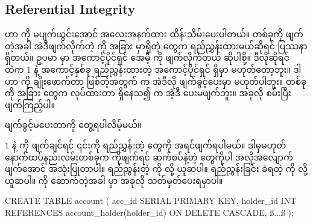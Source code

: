 \subsection*{Referential Integrity}
 ဟာ  ကို မပျက်ယွင်းအောင် အလေးအနက်ထား  ထိန်းသိမ်းပေးပါတယ်။  တစ်ခုကို ဖျက်တဲ့အခါ အဲဒီဖျက်လိုက်တဲ့  ကို အခြား  မှာရှိတဲ့  တွေက ရည်ညွှန်းထားမယ်ဆိုရင် ပြဿနာရှိတယ်။ ဥပမာ   မှာ အကောင့်ပိုင်ရှင် အေမီ့  ကို ဖျက်လိုက်တယ် ဆိုပါစို့။ ဒီလိုဆိုရင်   ထဲက  $1$ နဲ့ အကောင့်နှစ်ခု ရည်ညွှန်းထားတဲ့ အကောင့်ပိုင်ရှင်  ရှိမှာ မဟုတ်တော့ဘူး။ ဒါဟာ  ကို ချိုးဖောက်တာ ဖြစ်တဲ့အတွက်  က အဲဒီလို ဖျက်ခွင့်ပေးမှာ မဟုတ်ပါဘူး။  တစ်ခုကို အခြား  တွေက  လုပ်ထားတာ ရှိနေသ၍  က အဲ့ဒီ  ပေးမဖျက်ဘူး။ အခုလို စမ်းပြီး ဖျက်ကြည့်ပါ။ 
%
\begin{figure}[tbh!]
\caption{} 
\label{fig:ref_integrity}
\end{figure}%
ဖျက်ခွင့်မပေးတာကို တွေ့ရပါလိမ့်မယ်။

 $1$ နဲ့  ကို ဖျက်ချင်ရင် ၎င်းကို ရည်ညွှန်းတဲ့  တွေကို အရင်ဖျက်ရပါမယ်။ ဒါမှမဟုတ် နောက်ထပ်နည်းလမ်းတစ်ခုက  ကိုဖျက်ရင် ဆက်စပ်နဲ့တဲ့  တွေကိုပါ အလိုအလျောက် ဖျက်အောင်   အသုံးပြုတာပါ။ ရည်ညွှန်းတဲ့  ကို  လို့ ယူဆပါ။ ရည်ညွှန်းခြင်း ခံရတဲ့  ကို  လို့ ယူဆပါ။  ကို  ဆောက်တဲ့အခါ   မှာ အခုလို သတ်မှတ်ပေးရမှာပါ။
%
\begin{sql}
CREATE TABLE account (
    acc_id SERIAL PRIMARY KEY,
    holder_id INT REFERENCES account_holder(holder_id) ON DELETE CASCADE,
    ß$\ldots$ß
);
\end{sql}
%

